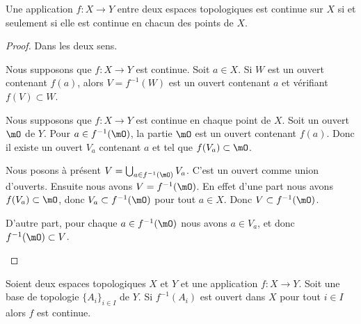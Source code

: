 \begin{proposition}		\label{PROPooOVKEooCkJmmO}
	Une application \(f \colon X\to Y  \) entre deux espaces topologiques est continue sur \( X\) si et seulement si elle est continue en chacun des points de \( X\).
\end{proposition}

\begin{proof}
	Dans les deux sens.
	\begin{subproof}
		\spitem[\( \Rightarrow\)]
		Nous supposons que \(f \colon X\to Y  \) est continue. Soit \( a\in X\). Si \( W\) est un ouvert contenant \( f(a)\), alors \( V=f^{-1}(W)\) est un ouvert contenant \( a\) et vérifiant \( f(V)\subset W\).

		\spitem[\( \Leftarrow\)]
		Nous supposons que \(f \colon X\to Y  \) est continue en chaque point de \( X\). Soit un ouvert \( \mO\) de \( Y\). Pour \( a\in f^{-1}(\mO)\), la partie \( \mO\) est un ouvert contenant \( f(a)\). Donc il existe un ouvert \( V_a\) contenant \( a\) et tel que \( f(V_a)\subset \mO\).

		Nous posons à présent \( V=\bigcup_{a\in f^{-1}(\mO)}V_a\). C'est un ouvert comme union d'ouverts. Ensuite nous avons \( V=f^{-1}(\mO)\). En effet d'une part nous avons \( f(V_a)\subset \mO\), donc \( V_a\subset f^{-1}(\mO)\) pour tout \( a\in X\).  Donc  \( V\subset f^{-1}(\mO)\).

		D'autre part, pour chaque \( a\in f^{-1}(\mO)\) nous avons \( a\in V_a\), et donc \( f^{-1}(\mO)\subset V\).
	\end{subproof}
\end{proof}

\begin{lemma}       \label{LEMooYTLSooKhetml}
	Soient deux espaces topologiques \( X\) et \( Y\) et une application \( f\colon X\to Y\). Soit une base de topologie \( \{ A_i \}_{i\in I}\) de \( Y\). Si \( f^{-1}(A_i) \) est ouvert dans \( X\) pour tout \( i\in I\) alors \( f\) est continue.
\end{lemma}

